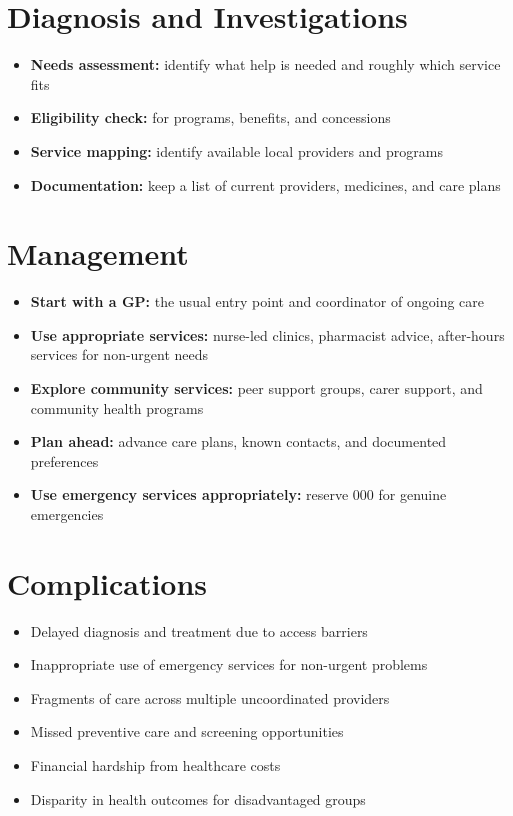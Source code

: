 \section*{Diagnosis and Investigations}
\begin{itemize}
    \item \textbf{Needs assessment:} identify what help is needed and roughly which service fits
    \item \textbf{Eligibility check:} for programs, benefits, and concessions
    \item \textbf{Service mapping:} identify available local providers and programs
    \item \textbf{Documentation:} keep a list of current providers, medicines, and care plans
\end{itemize}

\section*{Management}
\begin{itemize}
    \item \textbf{Start with a GP:} the usual entry point and coordinator of ongoing care
    \item \textbf{Use appropriate services:} nurse-led clinics, pharmacist advice, after-hours services for non-urgent needs
    \item \textbf{Explore community services:} peer support groups, carer support, and community health programs
    \item \textbf{Plan ahead:} advance care plans, known contacts, and documented preferences
    \item \textbf{Use emergency services appropriately:} reserve 000 for genuine emergencies
\end{itemize}

\section*{Complications}
\begin{itemize}
    \item Delayed diagnosis and treatment due to access barriers
    \item Inappropriate use of emergency services for non-urgent problems
    \item Fragments of care across multiple uncoordinated providers
    \item Missed preventive care and screening opportunities
    \item Financial hardship from healthcare costs
    \item Disparity in health outcomes for disadvantaged groups
\end{itemize}

